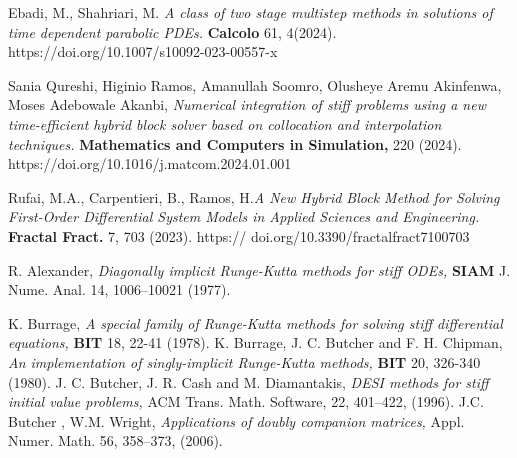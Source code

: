 \documentclass[11pt,twoside, final]{amsart}
\begin{document}
\begin{thebibliography}{}
Ebadi, M., Shahriari, M. \emph{A class of two stage multistep methods in solutions of time dependent parabolic PDEs.} \textbf{Calcolo} 61, 4(2024).  https://doi.org/10.1007/s10092-023-00557-x

Sania Qureshi, Higinio Ramos, Amanullah Soomro, Olusheye Aremu Akinfenwa, Moses Adebowale Akanbi, \emph{Numerical integration of stiff problems using a new time-efficient hybrid block solver based on collocation and interpolation techniques.} \textbf{Mathematics and Computers in Simulation,} 220 (2024).  https://doi.org/10.1016/j.matcom.2024.01.001

Rufai, M.A., Carpentieri, B.,  Ramos, H.\emph{A New Hybrid Block Method for Solving First-Order
Differential System Models in Applied Sciences and Engineering.} \textbf{Fractal Fract. } 7, 703 (2023).  https://
doi.org/10.3390/fractalfract7100703

  R. Alexander, \emph{Diagonally implicit Runge-Kutta methods for stiff ODEs,} \textbf{SIAM} J. Nume. Anal. 14, 1006--10021 (1977).

  K. Burrage, \emph{A special family of Runge-Kutta methods for solving stiff differential equations,} \textbf{BIT} 18, 22-41 (1978).
  K. Burrage, J. C. Butcher and F. H. Chipman, \emph{An implementation of  singly-implicit Runge-Kutta methods,} \textbf{BIT} 20, 326-340 (1980).
   J. C. Butcher, J. R. Cash and M. Diamantakis, \emph{DESI  methods  for stiff initial value problems,} ACM Trans. Math. Software, 22, 401--422, (1996).
  J.C. Butcher , W.M. Wright, \emph{Applications of doubly companion matrices,} Appl. Numer. Math. 56, 358--373, (2006).


\end{thebibliography}
\end{document}

